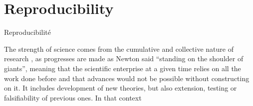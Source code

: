 




\newpage



\section{Reproducibility}{Reproducibilité}

\label{sec:reproducibility}












The strength of science comes from the cumulative and collective nature of research 
, as progresses are made as Newton said ``standing on the shoulder of giants'', meaning that the scientific enterprise at a given time relies on all the work done before and that advances would not be possible without constructing on it. It includes development of new theories, but also extension, testing or falsifiability of previous ones. In that context 




